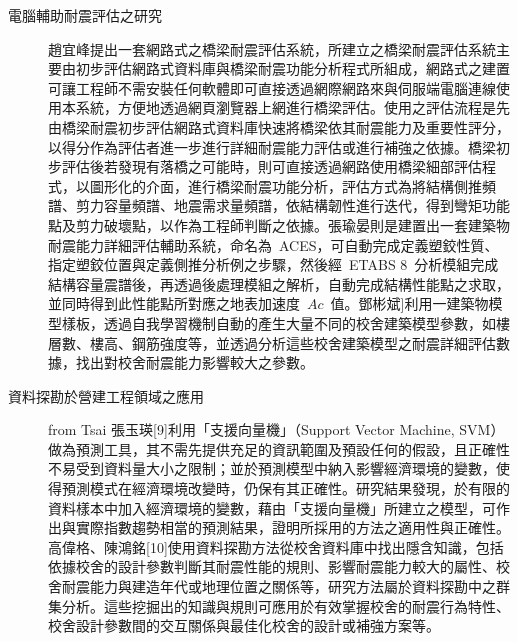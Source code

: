 \begin{description}
  \item[電腦輔助耐震評估之研究]
  趙宜峰\cite{chou2004master}提出一套網路式之橋梁耐震評估系統，所建立之橋梁耐震評估系統主要由初步評估網路式資料庫與橋梁耐震功能分析程式所組成，網路式之建置可讓工程師不需安裝任何軟體即可直接透過網際網路來與伺服端電腦連線使用本系統，方便地透過網頁瀏覽器上網進行橋梁評估。使用之評估流程是先由橋梁耐震初步評估網路式資料庫快速將橋梁依其耐震能力及重要性評分，以得分作為評估者進一步進行詳細耐震能力評估或進行補強之依據。橋梁初步評估後若發現有落橋之可能時，則可直接透過網路使用橋梁細部評估程式，以圖形化的介面，進行橋梁耐震功能分析，評估方式為將結構側推頻譜、剪力容量頻譜、地震需求量頻譜，依結構韌性進行迭代，得到彎矩功能點及剪力破壞點，以作為工程師判斷之依據。張瑜晏\cite{chang2004master}則是建置出一套建築物耐震能力詳細評估輔助系統，命名為~ACES，可自動完成定義塑鉸性質、指定塑鉸位置與定義側推分析例之步驟，然後經~ETABS 8~分析模組完成結構容量震譜後，再透過後處理模組之解析，自動完成結構性能點之求取，並同時得到此性能點所對應之地表加速度~$Ac$~值。鄧彬斌\cite{deng2005phd}]利用一建築物模型樣板，透過自我學習機制自動的產生大量不同的校舍建築模型參數，如樓層數、樓高、鋼筋強度等，並透過分析這些校舍建築模型之耐震詳細評估數據，找出對校舍耐震能力影響較大之參數。

  \item[資料探勘於營建工程領域之應用]
  from Tsai 張玉瑛[9]利用「支援向量機」（Support Vector Machine, SVM）做為預測工具，其不需先提供充足的資訊範圍及預設任何的假設，且正確性不易受到資料量大小之限制；並於預測模型中納入影響經濟環境的變數，使得預測模式在經濟環境改變時，仍保有其正確性。研究結果發現，於有限的資料樣本中加入經濟環境的變數，藉由「支援向量機」所建立之模型，可作出與實際指數趨勢相當的預測結果，證明所採用的方法之適用性與正確性。高偉格、陳鴻銘[10]使用資料探勘方法從校舍資料庫中找出隱含知識，包括依據校舍的設計參數判斷其耐震性能的規則、影響耐震能力較大的屬性、校舍耐震能力與建造年代或地理位置之關係等，研究方法屬於資料探勘中之群集分析。這些挖掘出的知識與規則可應用於有效掌握校舍的耐震行為特性、校舍設計參數間的交互關係與最佳化校舍的設計或補強方案等。



\end{description}